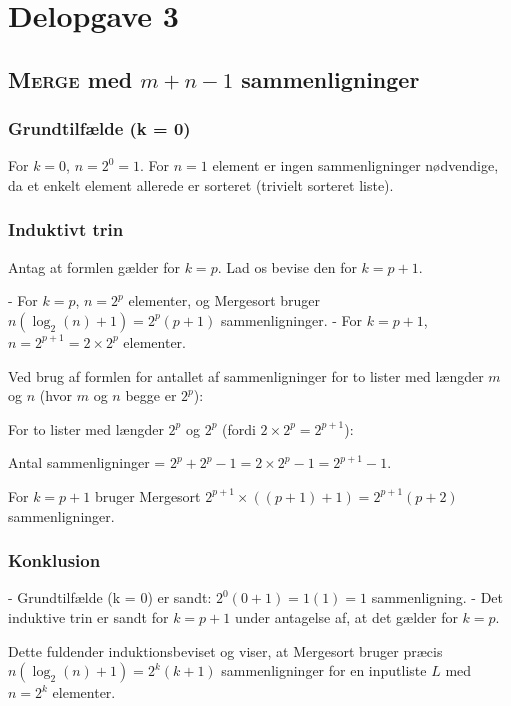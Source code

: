 \section{Delopgave 3}\label{sec:delopgave-33}

\subsection{\textsc{Merge} med \(m + n - 1\) sammenligninger}\label{subsec:merge-med-m-+-n-1-sammenligninger}

\subsubsection{Grundtilfælde (k = 0)}
For \(k = 0\), \(n = 2^0 = 1\).
For \(n = 1\) element er ingen sammenligninger nødvendige, da et enkelt element allerede er sorteret (trivielt
sorteret liste).

\subsubsection{Induktivt trin}
Antag at formlen gælder for \(k = p\).
Lad os bevise den for \(k = p + 1\).

- For \(k = p\), \(n = 2^p\) elementer, og Mergesort bruger \(n(\log_2(n) + 1) = 2^p(p + 1)\) sammenligninger.
- For \(k = p + 1\), \(n = 2^{p+1} = 2 \times 2^p\) elementer.

Ved brug af formlen for antallet af sammenligninger for to lister med længder \(m\) og \(n\) (hvor \(m\) og \(n\)
begge er \(2^p\)):

For to lister med længder \(2^p\) og \(2^p\) (fordi \(2 \times 2^p = 2^{p+1}\)):

Antal sammenligninger = \(2^p + 2^p - 1 = 2 \times 2^p - 1 = 2^{p+1} - 1\).

For \(k = p + 1\) bruger Mergesort \(2^{p+1} \times ((p+1) + 1) = 2^{p+1}(p+2)\) sammenligninger.

\subsubsection{Konklusion}
- Grundtilfælde (k = 0) er sandt: \(2^0(0 + 1) = 1(1) = 1\) sammenligning.
- Det induktive trin er sandt for \(k = p + 1\) under antagelse af, at det gælder for \(k = p\).

Dette fuldender induktionsbeviset og viser, at Mergesort bruger præcis \(n(\log_2(n) + 1) = 2^k(k + 1)\)
sammenligninger for en inputliste \(L\) med \(n = 2^k\) elementer.
